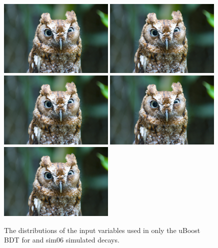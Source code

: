 \begin{figure}[htbp]
  \centering
    \includegraphics[width=0.49\textwidth]{./Figs/placeholder.jpeg}
    \includegraphics[width=0.49\textwidth]{./Figs/placeholder.jpeg}
    \includegraphics[width=0.49\textwidth]{./Figs/placeholder.jpeg}
    \includegraphics[width=0.49\textwidth]{./Figs/placeholder.jpeg}
    \includegraphics[width=0.49\textwidth]{./Figs/placeholder.jpeg}
 
  \caption{The distributions of the input variables used in only the uBoost BDT for \bsmumu and  sim06 simulated decays.}
  \label{fig:myBDTvars}
\end{figure}





